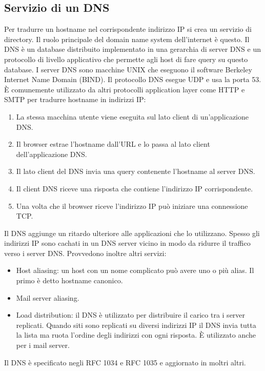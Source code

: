 \subsection{Servizio di un DNS}
Per tradurre un hostname nel corrispondente indirizzo IP si crea un servizio di directory. Il ruolo principale del domain name system dell'internet \`e questo. Il DNS \`e un database distribuito implementato in
una gerarchia di server DNS e un protocollo di livello applicativo che  permette agli host di fare query su questo database. I server DNS sono macchine UNIX che eseguono il software Berkeley Internet Name 
Domain (BIND). Il protocollo DNS esegue UDP e usa la porta 53. \`E comunemente utilizzato da altri protocolli application layer come HTTP e SMTP per tradurre hostname in indirizzi IP:
\begin{enumerate}
\item La stessa macchina utente viene eseguita sul lato client di un'applicazione DNS.
\item Il browser estrae l'hostname dall'URL e lo passa al lato client dell'applicazione DNS.
\item Il lato client del DNS invia una query contenente l'hostname al server DNS.
\item Il client DNS riceve una risposta che contiene l'indirizzo IP corrispondente.
\item Una volta che il browser riceve l'indirizzo IP pu\`o iniziare una connessione TCP.
\end{enumerate}
Il DNS aggiunge un ritardo ulteriore alle applicazioni che lo utilizzano. Spesso gli indirizzi IP sono cachati in un DNS server vicino in modo da ridurre il traffico verso i server DNS. Provvedono inoltre altri servizi:
\begin{itemize}
\item Host aliasing: un host con un nome complicato pu\`o avere uno o pi\`u alias. Il primo \`e detto hostname canonico.
\item Mail server aliasing. 
\item Load distribution: il DNS \`e utilizzato per distribuire il carico tra i server replicati. Quando siti sono replicati su diversi indirizzi IP il DNS invia tutta la lista ma ruota l'ordine degli indirizzi con ogni risposta. 
\`E utilizzato anche per i mail server.
\end{itemize}
Il DNS \`e specificato negli RFC 1034 e RFC 1035 e aggiornato in moltri altri.
